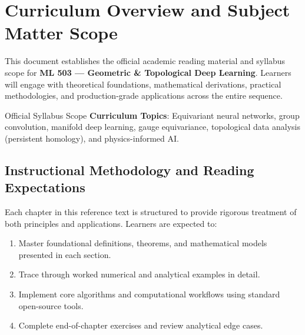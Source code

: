 \section{Curriculum Overview and Subject Matter Scope}

This document establishes the official academic reading material and syllabus scope for \textbf{ML 503 --- Geometric \& Topological Deep Learning}. Learners will engage with theoretical foundations, mathematical derivations, practical methodologies, and production-grade applications across the entire sequence.

\begin{InsightBox}{Official Syllabus Scope}
  \textbf{Curriculum Topics}: Equivariant neural networks, group convolution, manifold deep learning, gauge equivariance, topological data analysis (persistent homology), and physics-informed AI.
\end{InsightBox}

\subsection{Instructional Methodology and Reading Expectations}

Each chapter in this reference text is structured to provide rigorous treatment of both principles and applications. Learners are expected to:
\begin{enumerate}
  \item Master foundational definitions, theorems, and mathematical models presented in each section.
  \item Trace through worked numerical and analytical examples in detail.
  \item Implement core algorithms and computational workflows using standard open-source tools.
  \item Complete end-of-chapter exercises and review analytical edge cases.
\end{enumerate}

